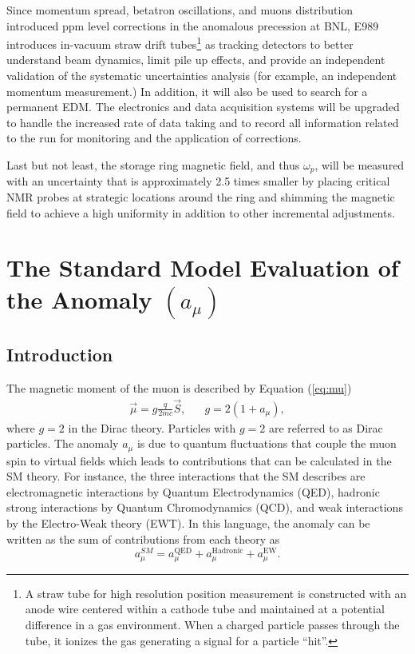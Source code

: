 \documentclass{outhesis}
\begin{document}
Since momentum spread, betatron oscillations, and muons distribution introduced ppm level corrections in the anomalous precession at BNL, E989 introduces in-vacuum straw drift tubes\footnote{A straw tube for high resolution position measurement is constructed with an anode wire centered within a cathode tube and maintained at a potential difference in a gas environment.  When a charged particle passes through the tube, it ionizes the gas generating a signal for a particle ``hit''. } as tracking detectors to better understand beam dynamics, limit pile up effects, and provide an independent validation of the systematic uncertainties analysis (for example, an independent momentum measurement.) In addition, it will also be used to search for a permanent EDM. The electronics and data acquisition systems will be upgraded to handle the increased rate of data taking and to record all information related to the run for monitoring and the application of corrections. 

Last but not least, the storage ring magnetic field, and thus $\omega_p$, will be measured with an uncertainty that is approximately 2.5 times smaller by placing critical NMR probes at strategic locations around the ring and shimming the magnetic field to achieve a high uniformity in addition to other incremental adjustments. \cite{e989}


\section{The Standard Model Evaluation of the Anomaly $\left(a_{\mu}\right)$}
\label{sec:sm}
\subsection{Introduction}
The magnetic moment of the muon is described by Equation (\ref{eq:mu})
\begin{equation}
\begin{split}
\overrightarrow{\mu} = g\frac{q}{2mc}\overrightarrow{S}, \,\,\,\,\,\,\,\,\,\,  g = 2\left(1+a_{\mu}\right),
\label{eq:mug}
\end{split}
\end{equation}
where $g=2$ in the Dirac theory. Particles with $g=2$ are referred to as Dirac particles. The anomaly $a_{\mu}$ is due to quantum fluctuations that couple the muon spin to virtual fields which leads to contributions that can be calculated in the SM theory. For instance, the three interactions that the SM describes are electromagnetic interactions by Quantum Electrodynamics (QED), hadronic strong interactions by Quantum Chromodynamics (QCD), and weak interactions by the Electro-Weak theory (EWT). In this language, the anomaly can be written as the sum of contributions from each theory as
\begin{equation}
a_{\mu}^{SM} = a_{\mu}^{\text{QED}}+a_{\mu}^{\text{Hadronic}}+a_{\mu}^{\text{EW}}.
\label{eq:asm}
\end{equation}
\end{document}
